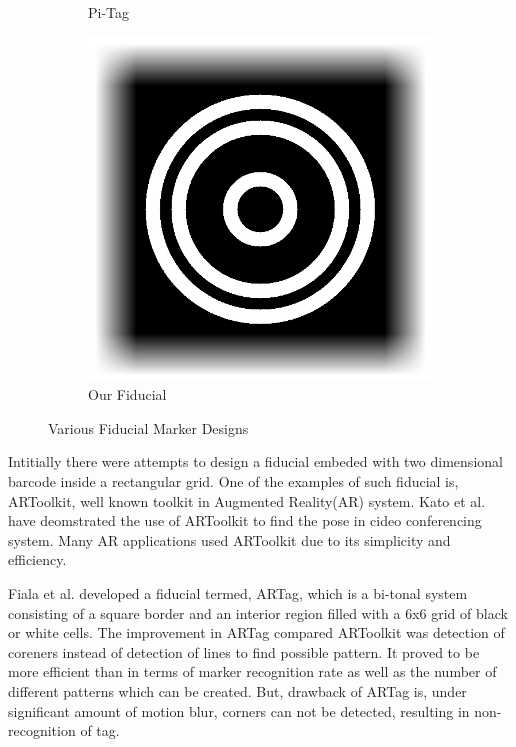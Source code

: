 \documentclass[runningheads]{llncs}
\begin{document}
\begin{figure}
\begin{subfigure}[b]{0.19\textwidth}
  Pi-Tag\cite{Pitag13}
 \end{subfigure}
 \begin{subfigure}[b]{0.19\textwidth}
  \centering
  \includegraphics[width=\linewidth]{our_fiducial}
  Our Fiducial
 \end{subfigure}
 \caption{Various Fiducial Marker Designs}
 \label{fig:previous_work}
\end{figure}

Intitially there were attempts to design a fiducial embeded with two dimensional
barcode inside a rectangular grid. One of the examples of such fiducial is,
ARToolkit\cite{ARToolkit02}, well known toolkit in Augmented Reality(AR) system. 
Kato et al.\cite{kato-artoolkit} have deomstrated the use of ARToolkit to find
the pose in cideo conferencing system. Many AR applications used ARToolkit
due to its simplicity and efficiency. 

Fiala et al. \cite{Fiala05} developed a fiducial termed, ARTag, which is a
bi-tonal system consisting of a square border and an interior region filled
with a 6x6 grid of black or white cells. The improvement in ARTag compared
ARToolkit was detection of coreners instead of detection of lines to find
possible pattern. It proved to be more efficient than \cite{ARToolkit02} in
terms of marker recognition rate as well as the number of different patterns
which can be created. But, drawback of ARTag is, under significant amount of
motion blur, corners can not be detected, resulting in non-recognition of tag.
\end{document}
